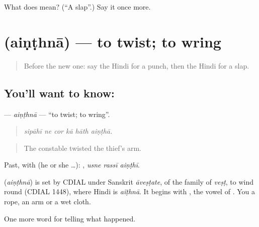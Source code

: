 \begin{tcolorbox}[breakable,colback=teal!4,colframe=teal!35!black,title={Before you move on}]
What does  mean? (\textquotedblleft{}A slap\textquotedblright{}.) Say it once more.
\end{tcolorbox}
\section[\texorpdfstring{\hi{ऐंठना} (aiṇṭhnā)}{ऐंठना (aiṇṭhnā)}]{ (aiṇṭhnā) — to twist; to wring}

\label{lesson:HI-C319-ainthna}



\begin{quote}
Before the new one: say the Hindi for a punch, then the Hindi for a slap.
\end{quote}

\subsection*{You'll want to know: }
\textbf{} — \emph{aiṇṭhnā} — \textquotedblleft{}to twist; to wring\textquotedblright{}.

\begin{quote}
     
\end{quote}

\begin{quote}
\emph{sipāhī ne cor kā hāth aiṇṭhā.}
\end{quote}

\begin{quote}
The constable twisted the thief's arm.
\end{quote}

Past, with  (he or she …):   , \emph{usne rassī aiṇṭhī}.

\begin{cousinweb}
\textbf{} (\emph{aiṇṭhnā}) is set by CDIAL under Sanskrit \emph{āveṣṭate}, of the family of \emph{veṣṭ}, to wind round (CDIAL 1448), where Hindi is \emph{aĩṭhnā}. It begins with \textbf{}, the vowel of \textbf{}. You \textbf{ } a rope, an arm or a wet cloth.
\end{cousinweb}

\begin{grammarlens}[title={What you've built}]
One more word for telling what happened.
\end{grammarlens}

